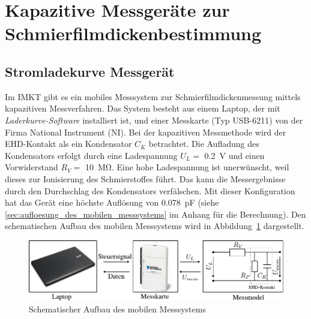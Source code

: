 \section{Kapazitive Messgeräte zur Schmierfilmdickenbestimmung}
\label{sec:kapazitive_messgeraete_zur_schmierfilmdickenbestimmung}

\subsection{Stromladekurve Messgerät}
\label{sub:stromladekurve_messgeraet}

Im IMKT gibt es ein mobiles Messsystem zur Schmierfilmdickenmessung mittels kapazitiven Messverfahren.
Das System besteht aus einem Laptop, der mit \textit{Laderkurve-Software} installiert ist, und einer Messkarte (Typ USB-6211) von der Firma National Instrument (NI).
Bei der kapazitiven Messmethode wird der EHD-Kontakt als ein Kondensator $C_K$ betrachtet.
Die Aufladung des Kondensators erfolgt durch eine Ladespannung $U_L =$ \SI{0,2}{\volt} und einen Vorwiderstand $R_V =$ \SI{10}{\mega\ohm}.
Eine hohe Ladespannung ist unerwünscht, weil dieses zur Ionisierung des Schmierstoffes führt.
Das kann die Messergebnisse durch den Durchschlag des Kondensators verfälschen.
Mit dieser Konfiguration hat das Gerät eine höchste Auflösung von \SI{0.078}{\pico\farad} (siehe \ref{sec:aufloesung_des_mobilen_messsystems} im Anhang für die Berechnung).
Den schematischen Aufbau des mobilen Messsystems wird in Abbildung~\ref{fig:schematischer_aufbau_des_mobilen_messsystems} dargestellt.

\begin{figure}[htb]
    \centering
    \includegraphics[]{./images/schematischer_aufbau_des_mobilen_messsystem.pdf}
    \caption{Schematischer Aufbau des mobilen Messsystems}
    \label{fig:schematischer_aufbau_des_mobilen_messsystems}
\end{figure}

